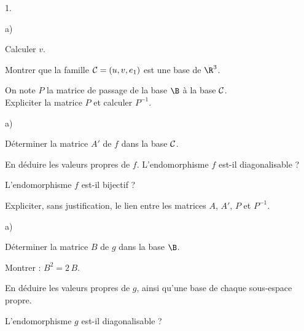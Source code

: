 \documentclass[11pt]{article}%
\begin{document}
\begin{noliste}{1.}
  \setlength{\itemsep}{4mm}
  \item 
  \begin{noliste}{a)}
    \setlength{\itemsep}{2mm}
    \item Calculer $v$.
    
    

    
    \item Montrer que la famille ${\cal C}=(u,v,e_1)$ est une base de 
    $\R^3$.
    
    

    
    \item On note $P$ la matrice de passage de la base $\B$ à la base 
    ${\cal C}$.\\
    Expliciter la matrice $P$ et calculer $P^{-1}$.
    
    
  \end{noliste}
  
  \item 
  \begin{noliste}{a)}
    \setlength{\itemsep}{2mm}
    \item Déterminer la matrice $A'$ de $f$ dans la base ${\cal C}$.
    
    

    
    \item En déduire les valeurs propres de $f$. L'endomorphisme $f$
    est-il diagonalisable ?
    
    

    
    \item L'endomorphisme $f$ est-il bijectif ?
    
    

    
    \item Expliciter, sans justification, le lien entre les matrices 
    $A$, $A'$, $P$ et $P^{-1}$.
    
    
  \end{noliste}
  
  \item 
  \begin{noliste}{a)}
    \setlength{\itemsep}{2mm}
    \item Déterminer la matrice $B$ de $g$ dans la base $\B$.
    
    

    
    \item Montrer : $B^2=2 \, B$.
    
    
    
    
    
    

    
    \item En déduire les valeurs propres de $g$, ainsi qu'une base de 
    chaque sous-espace propre.
    
    

    
    \item L'endomorphisme $g$ est-il diagonalisable ?
    
    
  \end{noliste}
\end{noliste}
\end{document}
